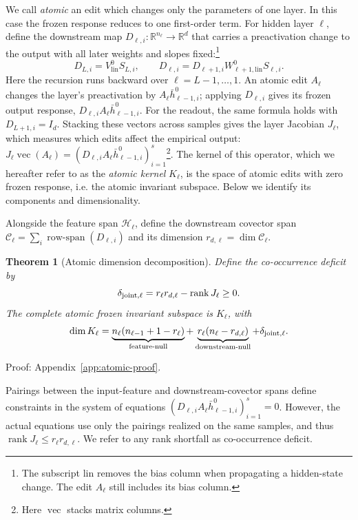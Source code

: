 \documentclass[twoside]{article}
\newtheorem{theorem}{Theorem}
\theoremstyle{remark}
\DeclareMathOperator{\rank}{rank}
\newcommand{\R}{\mathbb R}
\newcommand{\cC}{\mathcal C}
\newcommand{\cH}{\mathcal H}
\theoremstyle{highlightdefinition}
\theoremstyle{remark}
\begin{document}
We call \emph{atomic} an edit which changes only the parameters of one layer. In this case the frozen response reduces to one first-order term. For hidden layer $\ell$, define the downstream map $D_{\ell,i}:\R^{n_\ell}\to\R^d$ that carries a preactivation change to the output with all later weights and slopes fixed:\footnote{The subscript $\mathrm{lin}$ removes the bias column when propagating a hidden-state change. The edit $A_\ell$ still includes its bias column.}
\[
 D_{L,i}=V_{\mathrm{lin}}^0S_{L,i},\qquad
 D_{\ell,i}=D_{\ell+1,i}W_{\ell+1,\mathrm{lin}}^0S_{\ell,i}.
\]
Here the recursion runs backward over $\ell=L-1,\ldots,1$. An atomic edit $A_\ell$ changes the layer's preactivation by $A_\ell\bar h_{\ell-1,i}^0$; applying $D_{\ell,i}$ gives its frozen output response, $D_{\ell,i}A_\ell\bar h_{\ell-1,i}^0$. For the readout, the same formula holds with $D_{L+1,i}=I_d$. Stacking these vectors across samples gives the layer Jacobian $J_\ell$, which measures which edits affect the empirical output:  
$J_\ell\operatorname{vec}(A_\ell)=(D_{\ell,i}A_\ell\bar h_{\ell-1,i}^0)_{i=1}^s$\footnote{Here $\operatorname{vec}$ stacks matrix columns.}.
The kernel of this operator, which we hereafter refer to as the \emph{atomic kernel} $K_\ell$, is the space of atomic edits with zero frozen response, i.e. the atomic invariant subspace. 
Below we identify its components and dimensionality.


Alongside the feature span $\cH_\ell$, define the downstream covector span $\cC_\ell=\sum_i\operatorname{row-span}(D_{\ell,i})$ and its dimension $r_{d,\ell}=\dim\cC_\ell$.

\begin{theorem}[Atomic dimension decomposition]
\label{thm:atomic}
Define the \emph{co-occurrence deficit} by
\[
 \delta_{\rm joint,\ell}=r_\ell r_{d,\ell}-\rank J_\ell\ge0.
\]
The complete atomic frozen invariant subspace is $K_\ell$, with
\begin{equation}
 \dim K_\ell=\underbrace{n_\ell(n_{\ell-1}+1-r_\ell)}_{\text{feature-null}}+\underbrace{r_\ell(n_\ell-r_{d,\ell})}_{\text{downstream-null}}+\delta_{\rm joint,\ell}.
 \label{eq:atomic}
\end{equation}
\end{theorem}
 Proof: Appendix~\ref{app:atomic-proof}.

Pairings between the input-feature and downstream-covector spans define constraints in the system of equations $(D_{\ell,i}A_\ell\bar h_{\ell-1,i}^0)_{i=1}^s=0$. However, the actual equations use only the pairings realized on the same samples, and thus $\rank J_\ell\le r_\ell r_{d,\ell}$. We refer to any rank shortfall as co-occurrence deficit.
\end{document}
